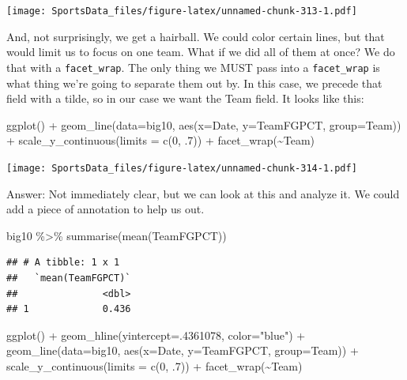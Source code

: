 \documentclass[
]{book}
\newenvironment{Shaded}{\begin{snugshade}}{\end{snugshade}}
\newcommand{\AttributeTok}[1]{\textcolor[rgb]{0.77,0.63,0.00}{#1}}
\newcommand{\DecValTok}[1]{\textcolor[rgb]{0.00,0.00,0.81}{#1}}
\newcommand{\FunctionTok}[1]{\textcolor[rgb]{0.00,0.00,0.00}{#1}}
\newcommand{\NormalTok}[1]{#1}
\newcommand{\SpecialCharTok}[1]{\textcolor[rgb]{0.00,0.00,0.00}{#1}}
\newcommand{\StringTok}[1]{\textcolor[rgb]{0.31,0.60,0.02}{#1}}
\begin{document}
\texttt{[image: SportsData\_files/figure-latex/unnamed-chunk-313-1.pdf]}

And, not surprisingly, we get a hairball. We could color certain lines, but that would limit us to focus on one team. What if we did all of them at once? We do that with a \texttt{facet\_wrap}. The only thing we MUST pass into a \texttt{facet\_wrap} is what thing we're going to separate them out by. In this case, we precede that field with a tilde, so in our case we want the Team field. It looks like this:

\begin{Shaded}
\begin{Highlighting}[]
\FunctionTok{ggplot}\NormalTok{() }\SpecialCharTok{+} 
  \FunctionTok{geom\_line}\NormalTok{(}\AttributeTok{data=}\NormalTok{big10, }\FunctionTok{aes}\NormalTok{(}\AttributeTok{x=}\NormalTok{Date, }\AttributeTok{y=}\NormalTok{TeamFGPCT, }\AttributeTok{group=}\NormalTok{Team)) }\SpecialCharTok{+} 
  \FunctionTok{scale\_y\_continuous}\NormalTok{(}\AttributeTok{limits =} \FunctionTok{c}\NormalTok{(}\DecValTok{0}\NormalTok{, .}\DecValTok{7}\NormalTok{)) }\SpecialCharTok{+} 
  \FunctionTok{facet\_wrap}\NormalTok{(}\SpecialCharTok{\textasciitilde{}}\NormalTok{Team)}
\end{Highlighting}
\end{Shaded}

\texttt{[image: SportsData\_files/figure-latex/unnamed-chunk-314-1.pdf]}

Answer: Not immediately clear, but we can look at this and analyze it. We could add a piece of annotation to help us out.

\begin{Shaded}
\begin{Highlighting}[]
\NormalTok{big10 }\SpecialCharTok{\%\textgreater{}\%} \FunctionTok{summarise}\NormalTok{(}\FunctionTok{mean}\NormalTok{(TeamFGPCT))}
\end{Highlighting}
\end{Shaded}

\begin{verbatim}
## # A tibble: 1 x 1
##   `mean(TeamFGPCT)`
##               <dbl>
## 1             0.436
\end{verbatim}

\begin{Shaded}
\begin{Highlighting}[]
\FunctionTok{ggplot}\NormalTok{() }\SpecialCharTok{+} 
  \FunctionTok{geom\_hline}\NormalTok{(}\AttributeTok{yintercept=}\NormalTok{.}\DecValTok{4361078}\NormalTok{, }\AttributeTok{color=}\StringTok{"blue"}\NormalTok{) }\SpecialCharTok{+} 
  \FunctionTok{geom\_line}\NormalTok{(}\AttributeTok{data=}\NormalTok{big10, }\FunctionTok{aes}\NormalTok{(}\AttributeTok{x=}\NormalTok{Date, }\AttributeTok{y=}\NormalTok{TeamFGPCT, }\AttributeTok{group=}\NormalTok{Team)) }\SpecialCharTok{+} 
  \FunctionTok{scale\_y\_continuous}\NormalTok{(}\AttributeTok{limits =} \FunctionTok{c}\NormalTok{(}\DecValTok{0}\NormalTok{, .}\DecValTok{7}\NormalTok{)) }\SpecialCharTok{+} 
  \FunctionTok{facet\_wrap}\NormalTok{(}\SpecialCharTok{\textasciitilde{}}\NormalTok{Team)}
\end{Highlighting}
\end{Shaded}
\end{document}
